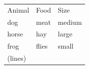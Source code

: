 \documentclass{article}
\begin{document}
\begin{tabular}{*{3}{l}}
Animal & Food & Size \\
dog & meat & medium \\
horse & hay & large \\
frog & flies & small \\
(lines)
\end{tabular}
\end{document}
